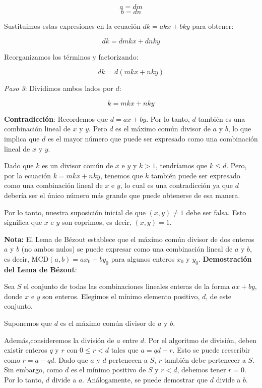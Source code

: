 \documentclass{article}
\begin{document}
\[ a = dm \]
\[ b = dn \]

Sustituimos estas expresiones en la ecuación \( dk = akx + bky \) para obtener:

\[ dk = dmkx + dnky \]

Reorganizamos los términos y factorizando:

\[ dk = d(mkx + nky) \]

\textit{Paso 3}: Dividimos ambos lados por \( d \):

\[ k = mkx + nky \]

\textbf{Contradicción}: Recordemos que \( d = ax + by \). Por lo tanto, \( d \) también es una combinación lineal de \( x \) y \( y \). Pero \( d \) es el máximo común divisor de \( a \) y \( b \), lo que implica que \( d \) es el mayor número que puede ser expresado como una combinación lineal de \( x \) y \( y \).

Dado que \( k \) es un divisor común de \( x \) e \( y \) y \( k > 1 \), tendríamos que \( k \leq d \). Pero, por la ecuación \( k = mkx + nky \), tenemos que \( k \) también puede ser expresado como una combinación lineal de \( x \) e \( y \), lo cual es una contradicción ya que \( d \) debería ser el único número más grande que puede obtenerse de esa manera.

Por lo tanto, nuestra suposición inicial de que \( (x, y) \neq 1 \) debe ser falsa. Esto significa que \( x \) e \( y \) son coprimos, es decir, \( (x, y) = 1 \).

\textbf{Nota:} El Lema de Bézout establece que el máximo común divisor de dos enteros \( a \) y \( b \) (no ambos nulos) se puede expresar como una combinación lineal de \( a \) y \( b \), es decir, \( \text{MCD}(a,b) = ax_0 + by_0 \) para algunos enteros \( x_0 \) y \( y_0 \). 
\textbf{Demostración del Lema de Bézout}:

Sea \( S \) el conjunto de todas las combinaciones lineales enteras de la forma \( ax + by \), donde \( x \) e \( y \) son enteros. Elegimos el mínimo elemento positivo, \( d \), de este conjunto.

Suponemos que \( d \) es el máximo común divisor de \( a \) y \( b \). 

Además,consideremos la división de \( a \) entre \( d \). Por el algoritmo de división, deben existir enteros \( q \) y \( r \) con \( 0 \leq r < d \) tales que \( a = qd + r \). Esto se puede reescribir como \( r = a - qd \). Dado que \( a \) y \( d \) pertenecen a \( S \), \( r \) también debe pertenecer a \( S \). Sin embargo, como \( d \) es el mínimo positivo de \( S \) y \( r < d \), debemos tener \( r = 0 \). Por lo tanto, \( d \) divide a \( a \). Análogamente, se puede demostrar que \( d \) divide a \( b \).
\end{document}
